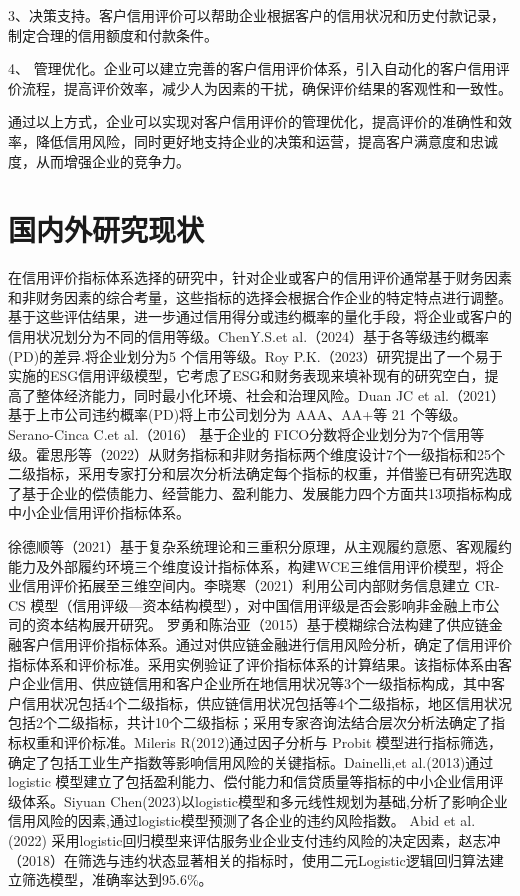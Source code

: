3、决策支持。客户信用评价可以帮助企业根据客户的信用状况和历史付款记录，制定合理的信用额度和付款条件。

4、 管理优化。企业可以建立完善的客户信用评价体系，引入自动化的客户信用评价流程，提高评价效率，减少人为因素的干扰，确保评价结果的客观性和一致性。

通过以上方式，企业可以实现对客户信用评价的管理优化，提高评价的准确性和效率，降低信用风险，同时更好地支持企业的决策和运营，提高客户满意度和忠诚度，从而增强企业的竞争力。

\section{国内外研究现状}

\nocite{*}
在信用评价指标体系选择的研究中，针对企业或客户的信用评价通常基于财务因素和非财务因素的综合考量，这些指标的选择会根据合作企业的特定特点进行调整。基于这些评估结果，进一步通过信用得分或违约概率的量化手段，将企业或客户的信用状况划分为不同的信用等级。ChenY.S.et al.（2024）基于各等级违约概率(PD)的差异.将企业划分为5 个信用等级。Roy P.K.（2023）研究提出了一个易于实施的ESG信用评级模型，它考虑了ESG和财务表现来填补现有的研究空白，提高了整体经济能力，同时最小化环境、社会和治理风险。Duan JC et al.（2021）基于上市公司违约概率(PD)将上市公司划分为 AAA、AA+等 21 个等级。Serano-Cinca C.et al.（2016） 基于企业的 FICO分数将企业划分为7个信用等级。霍思彤等（2022）从财务指标和非财务指标两个维度设计7个一级指标和25个二级指标，采用专家打分和层次分析法确定每个指标的权重，并借鉴已有研究选取了基于企业的偿债能力、经营能力、盈利能力、发展能力四个方面共13项指标构成中小企业信用评价指标体系。

徐德顺等（2021）基于复杂系统理论和三重积分原理，从主观履约意愿、客观履约能力及外部履约环境三个维度设计指标体系，构建WCE三维信用评价模型，将企业信用评价拓展至三维空间内。李晓寒（2021）利用公司内部财务信息建立 CR-CS 模型（信用评级—资本结构模型），对中国信用评级是否会影响非金融上市公司的资本结构展开研究。
罗勇和陈治亚（2015）基于模糊综合法构建了供应链金融客户信用评价指标体系。通过对供应链金融进行信用风险分析，确定了信用评价指标体系和评价标准。采用实例验证了评价指标体系的计算结果。该指标体系由客户企业信用、供应链信用和客户企业所在地信用状况等3个一级指标构成，其中客户信用状况包括4个二级指标，供应链信用状况包括等4个二级指标，地区信用状况包括2个二级指标，共计10个二级指标；采用专家咨询法结合层次分析法确定了指标权重和评价标准。Mileris R(2012)通过因子分析与 Probit 模型进行指标筛选，确定了包括工业生产指数等影响信用风险的关键指标。Dainelli,et al.(2013)通过 logistic 模型建立了包括盈利能力、偿付能力和信贷质量等指标的中小企业信用评级体系。Siyuan Chen(2023)以logistic模型和多元线性规划为基础,分析了影响企业信用风险的因素,通过logistic模型预测了各企业的违约风险指数。 Abid et al.(2022) 采用logistic回归模型来评估服务业企业支付违约风险的决定因素，赵志冲（2018）在筛选与违约状态显著相关的指标时，使用二元Logistic逻辑回归算法建立筛选模型，准确率达到95.6\%。
 
